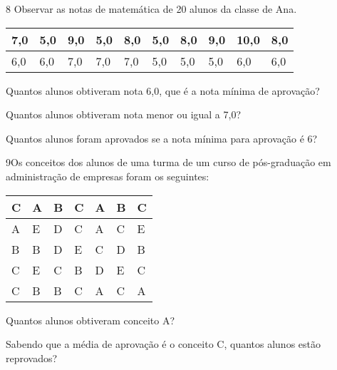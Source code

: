 \num{8} Observar as notas de matemática de 20 alunos da classe de Ana.

\begin{longtable}[]{@{}llllllllll@{}}
\toprule
7,0 & 5,0 & 9,0 & 5,0 & 8,0 & 5,0 & 8,0 & 9,0 & 10,0 &
8,0\tabularnewline
\midrule
\endhead
6,0 & 6,0 & 7,0 & 7,0 & 7,0 & 5,0 & 5,0 & 5,0 & 6,0 & 6,0\tabularnewline
\bottomrule
\end{longtable}

\begin{escolha}
\item
  Quantos alunos obtiveram nota 6,0, que é a nota mínima de aprovação?


\item
  Quantos alunos obtiveram nota menor ou igual a 7,0?


\item
  Quantos alunos foram aprovados se a nota mínima para aprovação é 6?

\end{escolha}


\num{9}Os conceitos dos alunos de uma turma de um curso de pós-graduação em
administração de empresas foram os seguintes:

\begin{longtable}[]{@{}lllllll@{}}
\toprule
C & A & B & C & A & B & C\tabularnewline
\midrule
\endhead
A & E & D & C & A & C & E\tabularnewline
B & B & D & E & C & D & B\tabularnewline
C & E & C & B & D & E & C\tabularnewline
C & B & B & C & A & C & A\tabularnewline
\bottomrule
\end{longtable}

\begin{escolha}
\item
  Quantos alunos obtiveram conceito A?


\item
  Sabendo que a média de aprovação é o conceito C, quantos alunos estão
  reprovados?

\end{escolha}



